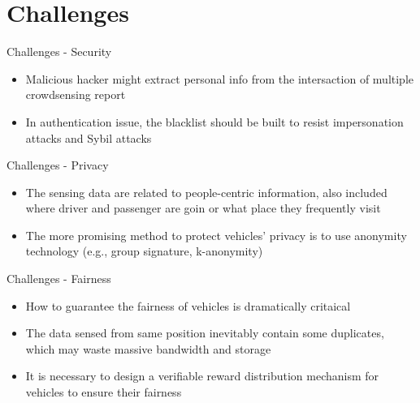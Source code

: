 \documentclass{beamer}
\begin{document}
\section{Challenges}
\begin{frame}{Challenges - Security}
    \begin{itemize}
        \item {Malicious hacker might extract personal info from the intersaction of multiple crowdsensing report}
        \item {In authentication issue, the blacklist should be built to resist impersonation attacks and Sybil attacks}
    \end{itemize}
\end{frame}
\begin{frame}{Challenges - Privacy}
    \begin{itemize}
        \item {The sensing data are related to people-centric information, also included where driver and passenger are goin or what place they frequently visit}
        \item {The more promising method to protect vehicles' privacy is to use anonymity technology (e.g., group signature, k-anonymity)}
    \end{itemize}
\end{frame}
\begin{frame}{Challenges - Fairness}
    \begin{itemize}
        \item {How to guarantee the fairness of vehicles is dramatically critaical}
        \item {The data sensed from same position inevitably contain some duplicates, which may waste massive bandwidth and storage}
        \item {It is necessary to design a verifiable reward distribution mechanism for vehicles to ensure their fairness}
    \end{itemize}
\end{frame}
\end{document}
